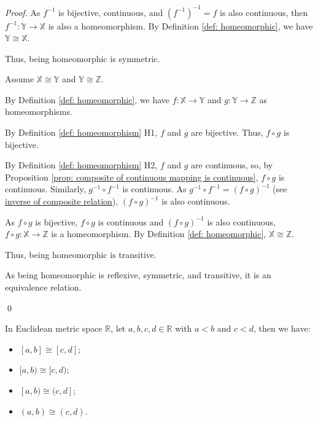 \begin{proposition}
\begin{proof}
		As $f^{-1}$ is bijective, continuous, and $(f^{-1})^{-1} = f$ is also continuous, then $f^{-1}: \mathbb Y \to \mathbb X$ is also a homeomorphism. By Definition \ref{def: homeomorphic}, we have $\mathbb Y \cong \mathbb X$.
		
		Thus, being homeomorphic is symmetric.
		
		\qedlm
		
		Assume $\mathbb X \cong \mathbb Y$ and $\mathbb Y \cong \mathbb Z$.
		
		By Definition \ref{def: homeomorphic}, we have $f: \mathbb X \to \mathbb Y$ and $g: \mathbb Y \to \mathbb Z$ as homeomorphisms.
		
		By Definition \ref{def: homeomorphism} H1, $f$ and $g$ are bijective. Thus, $f \circ g$ is bijective.
		
		By Definition \ref{def: homeomorphism} H2, $f$ and $g$ are continuous, so, by Proposition \ref{prop: composite of continuous mapping is continuous}, $f\circ g$ is continuous. Similarly, $g^{-1} \circ f^{-1}$ is continuous. As $g^{-1} \circ f^{-1} = (f \circ g)^{-1}$ (see \href{https://proofwiki.org/wiki/Inverse_of_Composite_Relation}{inverse of composite relation}), $(f \circ g)^{-1}$ is also continuous.
		
		As $f\circ g$ is bijective, $f\circ g$ is continuous and $(f\circ g)^{-1}$ is also continuous, $f \circ g : \mathbb X \to \mathbb Z$ is a homeomorphism. By Definition \ref{def: homeomorphic}, $\mathbb X \cong \mathbb Z$.
		
		Thus, being homeomorphic is transitive.
		
		\qedlm
		
		As being homeomorphic is reflexive, symmetric, and transitive, it is an equivalence relation.
		
		\qed
	\end{proof}
\end{proposition}



\begin{example}
	In Euclidean metric space $\mathbb R$, let $a, b, c, d \in \mathbb R$ with $a < b$ and $c < d$, then we have:
	\begin{itemize}
		\item $[a, b] \cong [c, d]$;
		\item $[a, b) \cong [c, d)$;
		\item $[a, b) \cong (c, d]$;
		\item $(a, b) \cong (c,d)$.
	\end{itemize}
\end{example}



